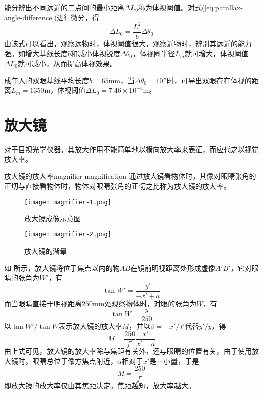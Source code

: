 \documentclass[cn,10pt,chinesefont=founder,math=newtx,cite=super,twoside]{elegantbook}
\begin{document}
能分辨出不同远近的二点间的最小距离$\Delta L_0$称为体视阈值。对式(\ref{eq:parallax-angle-difference})进行微分，得
\begin{equation}
\Delta L_0=\frac{L^2}{b}\Delta\theta_0
\end{equation}
由该式可以看出，观察远物时，体视阈值很大，观察近物时，辨别其远近的能力强。如增大基线长度$b$和减小体视锐度$\Delta\theta_0$，体视圈半径$L_m$就可增大，体视阈值$\Delta L_0$就可减小，从而提高体视效果。

\begin{note}
成年人的双眼基线平均长度$b=65\mathrm{mm}$，当$\Delta\theta_0=10''$时，可导出双眼存在体视的距离$L_m=1350\mathrm{m}$，体视阈值$\Delta L_0=7.46\times10^{-4}\mathrm{m}$。
\end{note}

\section{放大镜}

对于目视光学仪器，其放大作用不能简单地以横向放大率来表征，而应代之以视觉放大率。
\begin{definition}{放大镜的放大率}{magnifier-magnification}
	通过放大镜看物体时，其像对眼睛张角的正切与直接看物体时，物体对眼睛张角的正切之比称为放大镜的放大率。
\end{definition}

\begin{figure}[htbp]
	\centering
	\begin{minipage}[t]{0.48\textwidth}
		\centering
		\texttt{[image: magnifier-1.png]}
		\caption{放大镜成像示意图}
		\label{fig:magnifier-1}
	\end{minipage}
	\quad
	\begin{minipage}[t]{0.48\textwidth}
		\centering
		\texttt{[image: magnifier-2.png]}
		\caption{放大镜的渐晕}
		\label{fig:magnifier-2}
	\end{minipage}
\end{figure}

如 所示，放大镜将位于焦点以内的物$AB$在镜前明视距离处形成虚像$A'B'$，它对眼睛的张角为$W'$，有
\begin{equation}
\tan W'=\frac{y'}{-x'+a}
\end{equation}
而当眼睛直接于明视距离$250\mathrm{mm}$处观察物体时，对眼的张角为$W$，有
\begin{equation}
\tan W=\frac{y}{250}
\end{equation}
以$\tan W'/\tan W$表示放大镜的放大率$M$，并以$\beta=-x'/f'$代替$y'/y$，得
\begin{equation}
M=\frac{250}{f'}\frac{x'}{x'-a}
\end{equation}
由上式可见，放大镜的放大率除与焦距有关外，还与眼睛的位置有关，由于使用放大镜时，眼睛总位于像方焦点附近，$\alpha$相对于$x'$是一小量，于是
\begin{equation}
M=\frac{250}{f'}
\end{equation}
即放大镜的放大率仅由其焦距决定。焦距越短，放大率越大。
\end{document}
